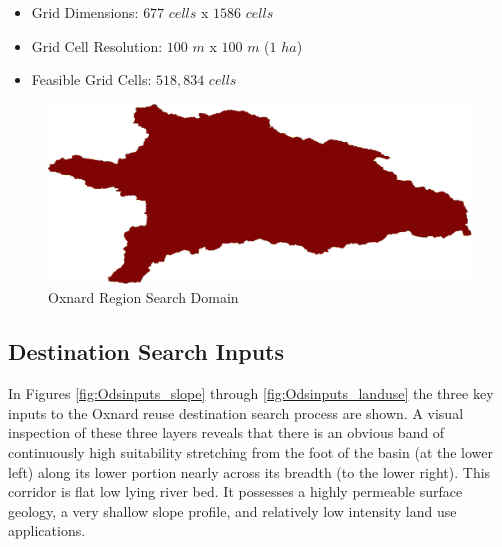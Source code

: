     \begin{itemize}
      \setlength{\itemsep}{0cm}
      \setlength{\parskip}{0cm}
        \item Grid Dimensions: $677$ $cells$ x $1586$ $cells$
        \item Grid Cell Resolution: $100$ $m$ x $100$ $m$ ($1$ $ha$)
        \item Feasible Grid Cells: $518,834$ $cells$
    \end{itemize}
    
        \begin{figure}[!h]
            \begin{center}
            \includegraphics[width=5.5in]{figures/Oxnard_SearchDomain.png}   
            \caption{Oxnard Region Search Domain}
            \label{fig:Odomain}
            \end{center}
        \end{figure}
        
    \subsection{Destination Search Inputs}
    
In Figures \ref{fig:Odsinputs_slope} through \ref{fig:Odsinputs_landuse} the three key inputs to the Oxnard reuse destination search process are shown. A visual inspection of these three layers reveals that there is an obvious band of continuously high suitability stretching from the foot of the basin (at the lower left) along its lower portion nearly across its breadth (to the lower right). This corridor is flat low lying river bed. It possesses a highly permeable surface geology, a very shallow slope profile, and relatively low intensity land use applications. 
    
